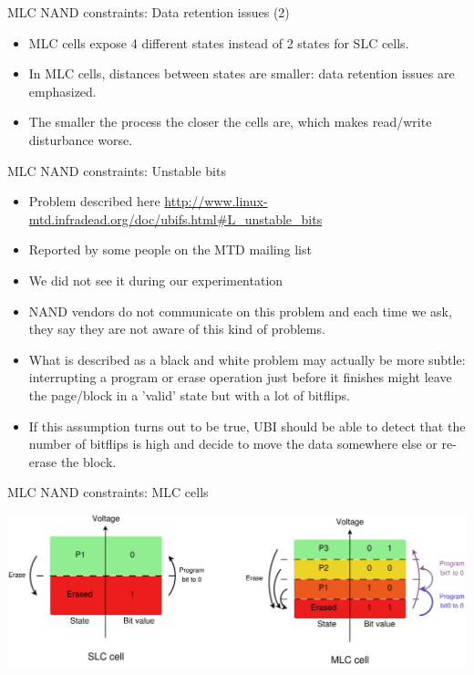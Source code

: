 \documentclass[aspectratio=169,obeyspaces,spaces,hyphens,dvipsnames]{beamer}
\begin{document}
\begin{frame}{MLC NAND constraints: Data retention issues (2)}
  \begin{itemize}
  \item MLC cells expose 4 different states instead of 2 states for
	SLC cells.
  \item In MLC cells, distances between states are smaller: data
	retention issues are emphasized.
  \item The smaller the process the closer the cells are, which makes
	read/write disturbance worse.
  \end{itemize}
\end{frame}

\begin{frame}{MLC NAND constraints: Unstable bits}
  \begin{itemize}
  \item Problem described here
	\url{http://www.linux-mtd.infradead.org/doc/ubifs.html\#L_unstable_bits}
  \item Reported by some people on the MTD mailing list
  \item We did not see it during our experimentation
  \item NAND vendors do not communicate on this problem and each
	time we ask, they say they are not aware of this kind of
	problems.
  \item What is described as a black and white problem may actually
	be more subtle: interrupting a program or erase operation
	just before it finishes might leave the page/block in a 'valid'
	state but with a lot of bitflips.
  \item If this assumption turns out to be true, UBI should be able to
	detect that the number of bitflips is high and decide to move
	the data somewhere else or re-erase the block.
  \end{itemize}
\end{frame}

\begin{frame}{MLC NAND constraints: MLC cells}
  \begin{center}
    \includegraphics[scale=0.2]{slc-mlc-cell.pdf}
  \end{center}
\end{frame}
\end{document}
